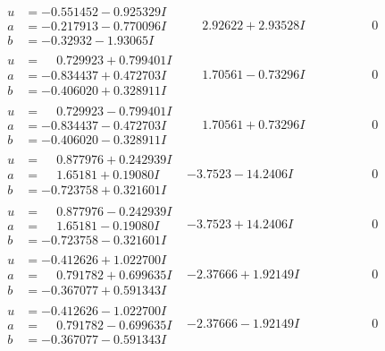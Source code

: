 \documentclass[1p]{elsarticle_modified}
\theoremstyle{definition}
\begin{document}
$$\begin{array}{c|c|c}
\begin{aligned}
u &= -0.551452 - 0.925329 I \\
a &= -0.217913 - 0.770096 I \\
b &= -0.32932 - 1.93065 I\end{aligned}
 & \phantom{-}2.92622 + 2.93528 I & \phantom{-0.000000 } 0 \\ \hline\begin{aligned}
u &= \phantom{-}0.729923 + 0.799401 I \\
a &= -0.834437 + 0.472703 I \\
b &= -0.406020 + 0.328911 I\end{aligned}
 & \phantom{-}1.70561 - 0.73296 I & \phantom{-0.000000 } 0 \\ \hline\begin{aligned}
u &= \phantom{-}0.729923 - 0.799401 I \\
a &= -0.834437 - 0.472703 I \\
b &= -0.406020 - 0.328911 I\end{aligned}
 & \phantom{-}1.70561 + 0.73296 I & \phantom{-0.000000 } 0 \\ \hline\begin{aligned}
u &= \phantom{-}0.877976 + 0.242939 I \\
a &= \phantom{-}1.65181 + 0.19080 I \\
b &= -0.723758 + 0.321601 I\end{aligned}
 & -3.7523 - 14.2406 I & \phantom{-0.000000 } 0 \\ \hline\begin{aligned}
u &= \phantom{-}0.877976 - 0.242939 I \\
a &= \phantom{-}1.65181 - 0.19080 I \\
b &= -0.723758 - 0.321601 I\end{aligned}
 & -3.7523 + 14.2406 I & \phantom{-0.000000 } 0 \\ \hline\begin{aligned}
u &= -0.412626 + 1.022700 I \\
a &= \phantom{-}0.791782 + 0.699635 I \\
b &= -0.367077 + 0.591343 I\end{aligned}
 & -2.37666 + 1.92149 I & \phantom{-0.000000 } 0 \\ \hline\begin{aligned}
u &= -0.412626 - 1.022700 I \\
a &= \phantom{-}0.791782 - 0.699635 I \\
b &= -0.367077 - 0.591343 I\end{aligned}
 & -2.37666 - 1.92149 I & \phantom{-0.000000 } 0\\

\end{array}$$
\end{document}

